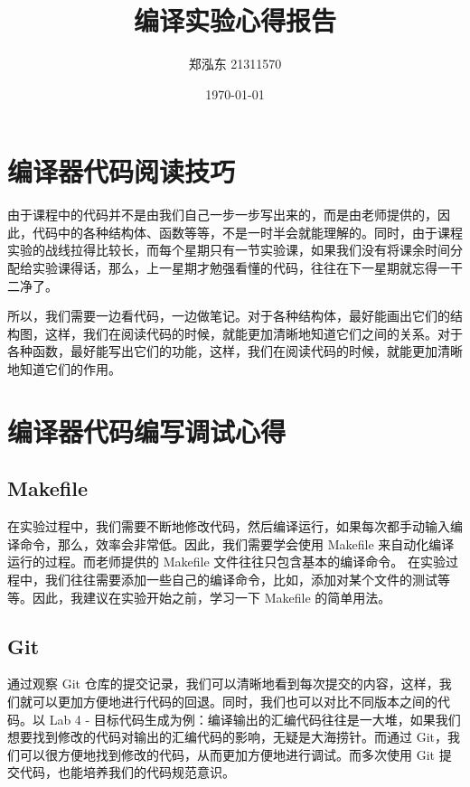 \documentclass{article}
\begin{document}
\sloppy %

\title{编译实验心得报告}
\author{郑泓东 21311570}
\date{\today}

\maketitle

\section{编译器代码阅读技巧}
由于课程中的代码并不是由我们自己一步一步写出来的，而是由老师提供的，因此，代码中的各种结构体、函数等等，不是一时半会就能理解的。同时，由于课程实验的战线拉得比较长，而每个星期只有一节实验课，如果我们没有将课余时间分配给实验课得话，那么，上一星期才勉强看懂的代码，往往在下一星期就忘得一干二净了。

所以，我们需要一边看代码，一边做笔记。对于各种结构体，最好能画出它们的结构图，这样，我们在阅读代码的时候，就能更加清晰地知道它们之间的关系。对于各种函数，最好能写出它们的功能，这样，我们在阅读代码的时候，就能更加清晰地知道它们的作用。

\section{编译器代码编写调试心得}

\subsection{Makefile}
在实验过程中，我们需要不断地修改代码，然后编译运行，如果每次都手动输入编译命令，那么，效率会非常低。因此，我们需要学会使用 Makefile 来自动化编译运行的过程。而老师提供的 Makefile 文件往往只包含基本的编译命令。
在实验过程中，我们往往需要添加一些自己的编译命令，比如，添加对某个文件的测试等等。因此，我建议在实验开始之前，学习一下 Makefile 的简单用法。

\subsection{Git}
通过观察 Git 仓库的提交记录，我们可以清晰地看到每次提交的内容，这样，我们就可以更加方便地进行代码的回退。同时，我们也可以对比不同版本之间的代码。以 Lab 4 - 目标代码生成为例：编译输出的汇编代码往往是一大堆，如果我们想要找到修改的代码对输出的汇编代码的影响，无疑是大海捞针。而通过 Git，我们可以很方便地找到修改的代码，从而更加方便地进行调试。而多次使用 Git 提交代码，也能培养我们的代码规范意识。
\end{document}
